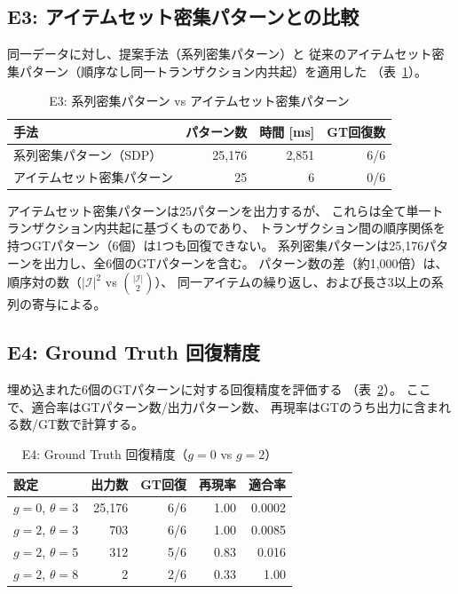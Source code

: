 \documentclass[11pt,a4paper]{article}
\begin{document}
\subsection{E3: アイテムセット密集パターンとの比較}

同一データに対し、提案手法（系列密集パターン）と
従来のアイテムセット密集パターン（順序なし同一トランザクション内共起）を適用した
（表~\ref{tab:comparison}）。

\begin{table}[t]
\centering
\caption{E3: 系列密集パターン vs アイテムセット密集パターン}
\label{tab:comparison}
\begin{tabular}{lrrr}
\toprule
手法 & パターン数 & 時間 [ms] & GT回復数 \\
\midrule
系列密集パターン（SDP）     & 25,176 & 2,851 & 6/6 \\
アイテムセット密集パターン   &     25 &     6 & 0/6 \\
\bottomrule
\end{tabular}
\end{table}

アイテムセット密集パターンは25パターンを出力するが、
これらは全て単一トランザクション内共起に基づくものであり、
トランザクション間の順序関係を持つGTパターン（6個）は1つも回復できない。
系列密集パターンは25,176パターンを出力し、全6個のGTパターンを含む。
パターン数の差（約1,000倍）は、順序対の数（$|\mathcal{I}|^2$ vs $\binom{|\mathcal{I}|}{2}$）、
同一アイテムの繰り返し、および長さ3以上の系列の寄与による。

\subsection{E4: Ground Truth 回復精度}

埋め込まれた6個のGTパターンに対する回復精度を評価する
（表~\ref{tab:gt_recovery}）。
ここで、適合率はGTパターン数/出力パターン数、
再現率はGTのうち出力に含まれる数/GT数で計算する。

\begin{table}[t]
\centering
\caption{E4: Ground Truth 回復精度（$g=0$ vs $g=2$）}
\label{tab:gt_recovery}
\begin{tabular}{lrrrr}
\toprule
設定 & 出力数 & GT回復 & 再現率 & 適合率 \\
\midrule
$g = 0$, $\theta = 3$ & 25,176 & 6/6 & 1.00 & 0.0002 \\
$g = 2$, $\theta = 3$ &    703 & 6/6 & 1.00 & 0.0085 \\
$g = 2$, $\theta = 5$ &    312 & 5/6 & 0.83 & 0.016 \\
$g = 2$, $\theta = 8$ &      2 & 2/6 & 0.33 & 1.00 \\
\bottomrule
\end{tabular}
\end{table}
\end{document}
